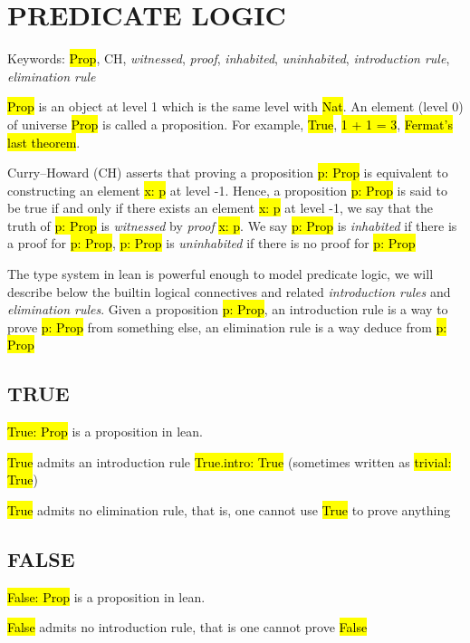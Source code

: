 \chapter{PREDICATE LOGIC}

Keywords: \hl{Prop}, CH, \textit{witnessed}, \textit{proof}, \textit{inhabited}, \textit{uninhabited}, \textit{introduction rule}, \textit{elimination rule}

\hl{Prop} is an object at level 1 which is the same level with \hl{Nat}. An element (level 0) of universe \hl{Prop} is called a proposition. For example, \hl{True}, \hl{1 + 1 = 3}, \hl{Fermat's last theorem}.

Curry–Howard (CH) \cite{CH} asserts that proving a proposition \hl{p: Prop} is equivalent to constructing an element \hl{x: p} at level -1. Hence, a proposition \hl{p: Prop} is said to be true if and only if there exists an element  \hl{x: p} at level -1, we say that the truth of \hl{p: Prop} is \textit{witnessed} by \textit{proof} \hl{x: p}. We say \hl{p: Prop} is \textit{inhabited} if there is a proof for \hl{p: Prop}, \hl{p: Prop} is \textit{uninhabited} if there is no proof for \hl{p: Prop}

The type system in lean is powerful enough to model predicate logic, we will describe below the builtin logical connectives and related \textit{introduction rules} and \textit{elimination rules}. Given a proposition \hl{p: Prop}, an introduction rule is a way to prove \hl{p: Prop} from something else, an elimination rule is a way deduce from \hl{p: Prop}

\section{TRUE}

\hl{True: Prop} is a proposition in lean.

\hl{True} admits an introduction rule \hl{True.intro: True} (sometimes written as \hl{trivial: True})

\hl{True} admits no elimination rule, that is, one cannot use \hl{True} to prove anything

\section{FALSE}

\hl{False: Prop} is a proposition in lean.

\hl{False} admits no introduction rule, that is one cannot prove \hl{False}

